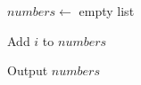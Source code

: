 \begin{algorithm}
\caption{Create List of Numbers Divisible by 5 or 6}
\begin{algorithmic}[1]

\STATE $numbers \gets$ empty list


        \STATE Add $i$ to $numbers$
    \ENDIF

\ENDFOR

\STATE Output $numbers$

\end{algorithmic}
\end{algorithm}